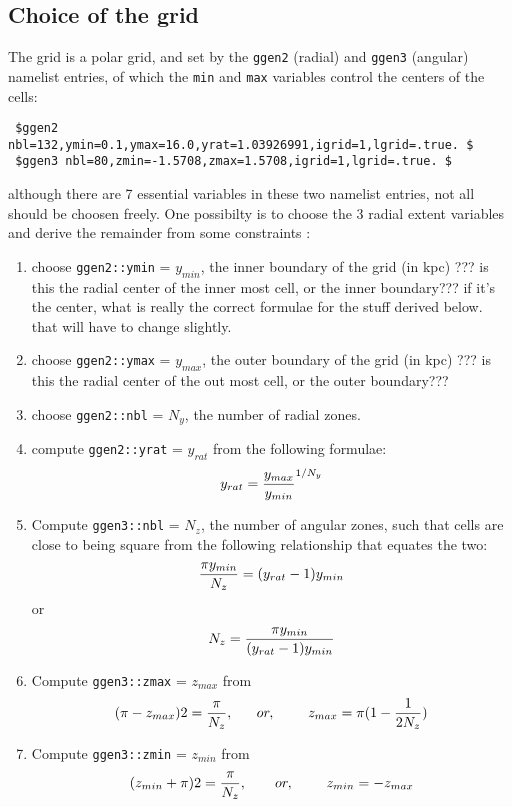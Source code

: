 \documentclass[11pt,epsf]{article}
\begin{document}
\subsection{Choice of the grid}

The grid is a polar grid, and set by the {\tt ggen2} (radial) and 
{\tt ggen3} (angular) namelist entries, of which the {\tt min} and
{\tt max} variables control the centers of the cells:

\begin{verbatim}
 $ggen2 nbl=132,ymin=0.1,ymax=16.0,yrat=1.03926991,igrid=1,lgrid=.true. $
 $ggen3 nbl=80,zmin=-1.5708,zmax=1.5708,igrid=1,lgrid=.true. $
\end{verbatim}

although there are 7 essential variables in these 
two namelist entries, not all should be choosen freely. 
One possibilty is to choose the 3 radial extent variables
and derive the remainder from some constraints :


\begin{enumerate}
\item
choose  {\tt ggen2::ymin} = $y_{min}$, the inner boundary of the grid (in kpc)
??? is this the radial center of the inner most cell, or the inner boundary???
if it's the center, what is really the correct formulae for the stuff derived below.
that will have to change slightly.

\item
choose {\tt ggen2::ymax} = $y_{max}$, the outer boundary of the grid (in kpc)
??? is this the radial center of the out most cell, or the outer boundary???

\item
choose {\tt ggen2::nbl} = $N_y$, the number of radial zones.

\item
compute {\tt ggen2::yrat} = $y_{rat}$ from the following formulae:
$$
	 y_{rat} = {y_{max} \over y_{min}}^{1/{N_y}}
$$

\item
Compute {\tt ggen3::nbl} = $N_z$, the number of angular zones, such that cells are 
close to being square from the following relationship that equates the two:
$$
	{{\pi y_{min}} \over N_z} = (y_{rat} - 1 ) y_{min}
$$
or
$$
N_z =   {  {\pi y_{min}  }   \over  { (y_{rat} - 1 ) y_{min} } }
$$

\item
Compute {\tt ggen3::zmax} = $z_{max}$ from
$$
	( \pi - z_{max} ) 2 = {\pi \over N_z}, ~~~~~ or,~~~~~~~
	z_{max} = \pi ( 1 - {1 \over {2 N_z}})
$$

\item
Compute {\tt ggen3::zmin} = $z_{min}$ from
$$
	( z_{min} + \pi ) 2 = {\pi \over N_z}, ~~~~~~ or,~~~~~~~
	z_{min} = - z_{max} 
$$



\end{enumerate}
\end{document}
